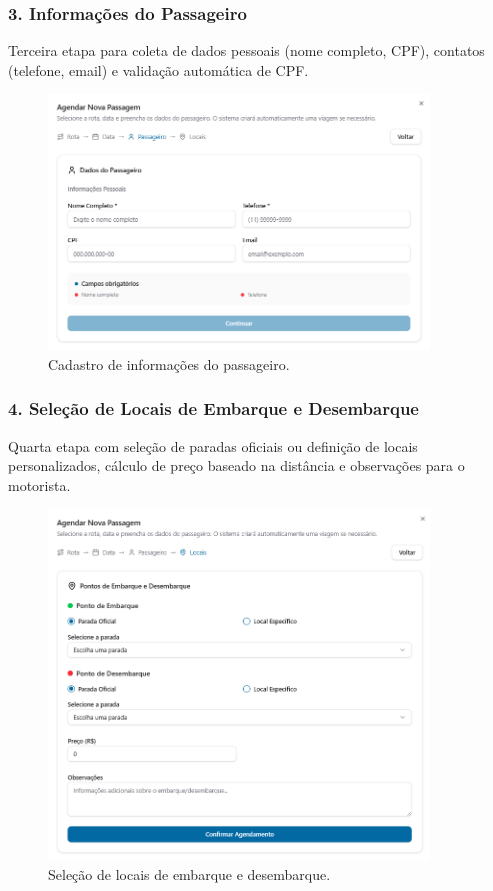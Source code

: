 \subsubsection{3. Informações do Passageiro}

Terceira etapa para coleta de dados pessoais (nome completo, CPF), contatos (telefone, email) e validação automática de CPF.

\begin{figure}[H]
  \centering
  \includegraphics[width=0.9\textwidth]{imagens/wizard-passageiro.png}
  \caption{Cadastro de informações do passageiro.}
  \label{fig:wizard-passageiro}
\end{figure}

\subsubsection{4. Seleção de Locais de Embarque e Desembarque}

Quarta etapa com seleção de paradas oficiais ou definição de locais personalizados, cálculo de preço baseado na distância e observações para o motorista.

\begin{figure}[H]
  \centering
  \includegraphics[width=0.9\textwidth]{imagens/wizard-locais.png}
  \caption{Seleção de locais de embarque e desembarque.}
  \label{fig:wizard-locais}
\end{figure}

